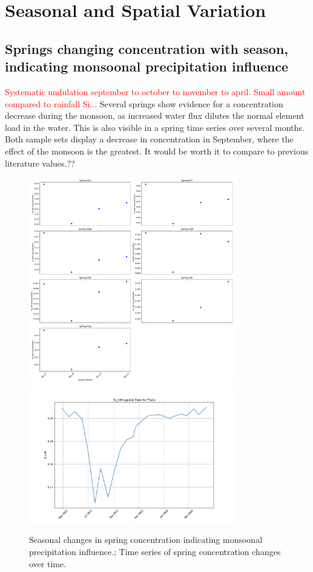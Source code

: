 
\section{Seasonal and Spatial Variation}

\subsection{Springs changing concentration with season, indicating monsoonal precipitation influence}
\textcolor{red}{Systematic undulation september to october to november to april. Small amount compared to rainfall Si...} Several springs show evidence for a concentration decrease during the monsoon, as increased water flux dilutes the normal element load in the water. This is also visible in a spring time series over several months. Both sample sets display a decrease in concentration in September, where the effect of the monsoon is the greatest. It would be worth it to compare to previous literature values.??




\begin{figure}[h]
    \centering
    \includegraphics[width=0.8\textwidth]{Si_mM_concentrations_springs.pdf}
    \includegraphics[width=0.8\textwidth]{Si_mM_Thalo_timeseries.pdf}
    \caption{Seasonal changes in spring concentration indicating monsoonal precipitation influence.; Time series of spring concentration changes over time.}
    \label{fig:time_series_changes}
\end{figure}

